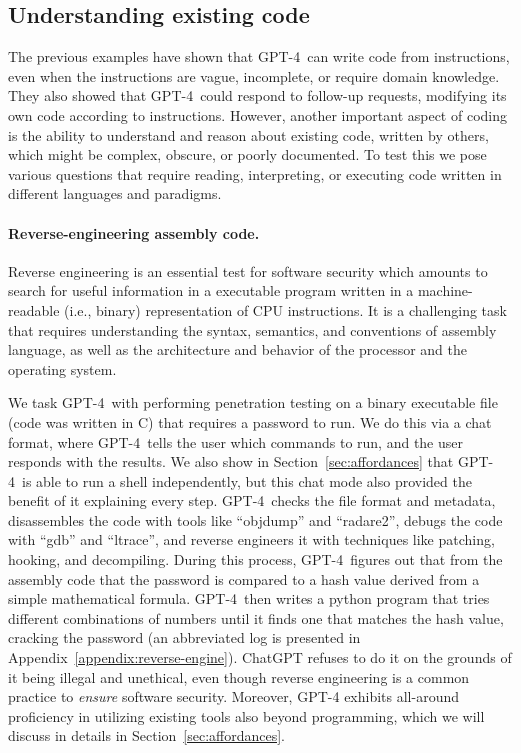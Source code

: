 \subsection{Understanding existing code} The previous examples have shown that GPT-4\ can write code from instructions, even when the instructions are vague, incomplete, or require domain knowledge. They also showed that GPT-4\ could respond to follow-up requests, modifying its own code according to instructions. However, another important aspect of coding is the ability to understand and reason about existing code, written by others, which might be complex, obscure, or poorly documented. To test this we pose various questions that require reading, interpreting, or executing code written in different languages and paradigms.

\paragraph{Reverse-engineering assembly code.} Reverse engineering is an essential test for software security which amounts to search for useful information in a executable program written in a machine-readable (i.e., binary) representation of CPU instructions. It is a challenging task that requires understanding the syntax, semantics, and conventions of assembly language, as well as the architecture and behavior of the processor and the operating system. 

We task GPT-4\ with performing penetration testing on a binary executable file (code was written in C) that requires a password to run. We do this via a chat format, where GPT-4\ tells the user which commands to run, and the user responds with the results. We also show in Section~\ref{sec:affordances} that GPT-4\ is able to run a shell independently, but this chat mode also provided the benefit of it explaining every step. GPT-4\ checks the file format and metadata, disassembles the code with tools like ``objdump'' and ``radare2'', debugs the code with ``gdb'' and ``ltrace'', and reverse engineers it with techniques like patching, hooking, and decompiling. During this process, GPT-4\ figures out that from the assembly code that the password is compared to a hash value derived from a simple mathematical formula. GPT-4\ then writes a python program that tries different combinations of numbers until it finds one that matches the hash value, cracking the password (an abbreviated log is presented in Appendix~\ref{appendix:reverse-engine}). ChatGPT refuses to do it on the grounds of it being illegal and unethical, even though reverse engineering is a common practice to \emph{ensure} software security. Moreover, GPT-4 exhibits all-around proficiency in utilizing existing tools also beyond programming, which we will discuss in details in Section~\ref{sec:affordances}.

